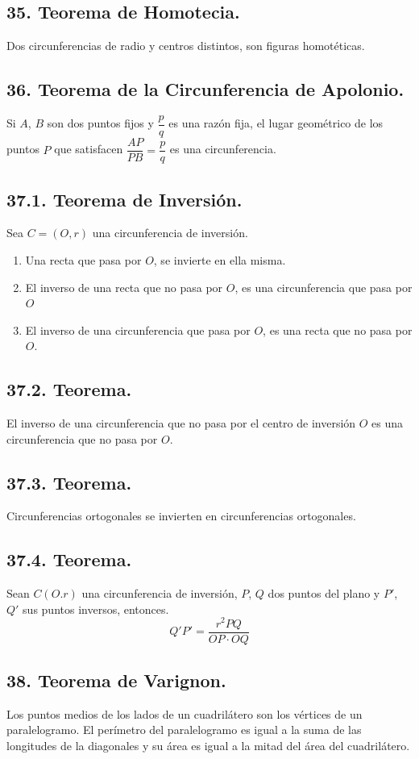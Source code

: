 \documentclass[12pt,a4paper]{article}
\begin{document}
\subsection*{35. Teorema de Homotecia.}
Dos circunferencias de radio  y centros distintos, son figuras homotéticas.
\subsection*{36. Teorema de la Circunferencia de Apolonio.}
Si $A$, $B$ son dos puntos fijos y $\dfrac{p}{q}$ es una razón fija, el lugar geométrico de los puntos $P$ que satisfacen $\dfrac{AP}{PB}=\dfrac{p}{q}$ es una circunferencia.
\subsection*{37.1. Teorema de Inversión.}
Sea $C=(O, r)$ una circunferencia de inversión. 
\begin{enumerate}
\item Una recta que pasa por $O$, se invierte en ella misma.
\item El inverso de una recta que no pasa por $O$, es una circunferencia que pasa por $O$
\item El inverso de una circunferencia que pasa por $O$, es una recta que no pasa por $O$.
\end{enumerate}
\subsection*{37.2. Teorema.}
El inverso de una circunferencia que no pasa por el centro de inversión $O$ es una circunferencia que no pasa por $O$.
\subsection*{37.3. Teorema.}
Circunferencias ortogonales se invierten en circunferencias ortogonales.
\subsection*{37.4. Teorema.}
Sean $C(O. r)$ una circunferencia de inversión, $P$, $Q$ dos puntos del plano y $P'$, $Q'$ sus puntos inversos, entonces.$$Q'P'= \dfrac{r^2PQ}{OP \cdot OQ}$$
\subsection*{38. Teorema de Varignon.}
Los puntos medios de los lados de un cuadrilátero son los vértices de un paralelogramo. El perímetro del paralelogramo es igual a la suma de las longitudes de la diagonales y su área es igual a la mitad del área del cuadrilátero. 
\end{document}
